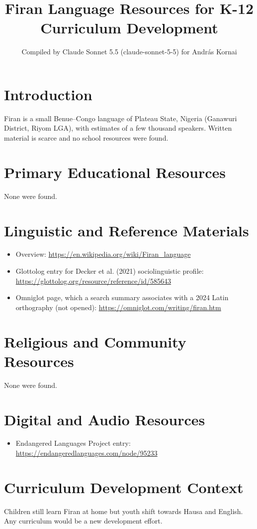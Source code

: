 \documentclass[12pt]{article}
\title{Firan Language Resources for K-12 Curriculum Development}
\author{Compiled by Claude Sonnet 5.5 (claude-sonnet-5-5) for Andr\'as Kornai}
\date{}
\begin{document}
\maketitle
\section{Introduction}
Firan is a small Benue--Congo language of Plateau State, Nigeria (Ganawuri District, Riyom LGA), with estimates of a few thousand speakers. Written material is scarce and no school resources were found.
\section{Primary Educational Resources}
None were found.
\section{Linguistic and Reference Materials}
\begin{itemize}
\item Overview: \url{https://en.wikipedia.org/wiki/Firan_language}
\item Glottolog entry for Decker et al. (2021) sociolinguistic profile: \url{https://glottolog.org/resource/reference/id/585643}
\item Omniglot page, which a search summary associates with a 2024 Latin orthography (not opened): \url{https://omniglot.com/writing/firan.htm}
\end{itemize}
\section{Religious and Community Resources}
None were found.
\section{Digital and Audio Resources}
\begin{itemize}
\item Endangered Languages Project entry: \url{https://endangeredlanguages.com/node/95233}
\end{itemize}
\section{Curriculum Development Context}
Children still learn Firan at home but youth shift towards Hausa and English. Any curriculum would be a new development effort.
\end{document}
